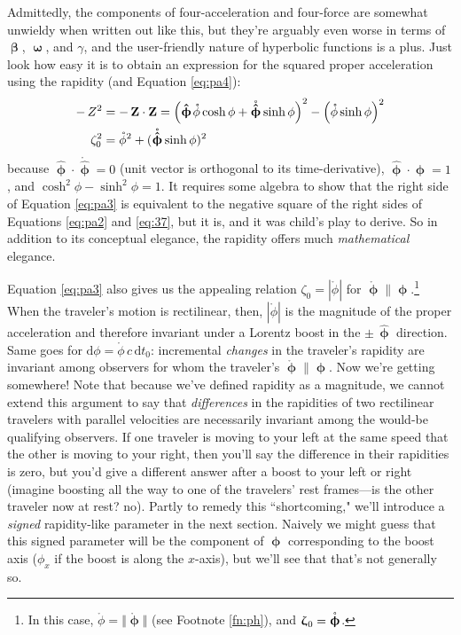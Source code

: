 \documentclass[12pt]{article}
\renewcommand{\vv}[1]{\mathbf{#1}}
\newcommand{\dd}[1]{\mathrm{d}#1}
\newcommand{\vvbeta}{\bm{\upbeta}}
\newcommand{\vvomega}{\bm{\upomega}}
\newcommand{\vvphi}{\bm{\upphi}}
\newcommand{\hatphi}{\bm{\hat{\upphi}}}
\newcommand{\vvzeta}{\bm{\upzeta}}
\begin{document}
Admittedly, the components of four-acceleration and four-force are somewhat unwieldy when written out like this, but they're arguably even worse in terms of $\vvbeta$, $\vvomega$, and $\gamma$, and the user-friendly nature of hyperbolic functions is a plus. Just look how easy it is to obtain an expression for the squared proper acceleration using the rapidity (and Equation \ref{eq:pa4}):
\begin{equation}\label{eq:pa3}
\begin{split}
- \, Z^2 &= - \, \vv Z \cdot \vv Z = \left( \hatphi \mkern1.5mu \mathring{\phi} \cosh{\phi} + \mathring{\hatphi} \sinh{\phi} \right)^2 - \left( \mathring{\phi} \sinh{\phi} \right)^2 \\
\zeta_0^2 &= \mathring{\phi}^2 + (\mathring{\hatphi} \sinh{\phi})^2 
\end{split}
\end{equation}
because $\hatphi \cdot \mathring{\hatphi} = 0$ (unit vector is orthogonal to its time-derivative), $\hatphi \cdot \hatphi = 1$, and $\cosh^{2}{\phi} - \sinh^{2}{\phi} = 1$. It requires some algebra to show that the right side of Equation \ref{eq:pa3} is equivalent to the negative square of the right sides of Equations \ref{eq:pa2} and \ref{eq:37}, but it is, and it was child's play to derive. So in addition to its conceptual elegance, the rapidity offers much \emph{mathematical} elegance.

Equation \ref{eq:pa3} also gives us the appealing relation $\zeta_0 = | \mathring{\phi} |$ for $\mathring{\vvphi} \parallel \vvphi$.\footnote{In this case, $\mathring{\phi} = \Vert \mathring{\vvphi} \Vert$ (see Footnote \ref{fn:ph}), and $\vvzeta_{\mkern1mu 0} = \mathring{\vvphi}$.} When the traveler's motion is rectilinear, then, $| \mathring{\phi} |$ is the magnitude of the proper acceleration and therefore invariant under a Lorentz boost in the $\pm \, \hatphi$ direction. Same goes for $\dd \phi = \mathring{\phi} \, c \, \dd t_0$: incremental \emph{changes} in the traveler's rapidity are invariant among observers for whom the traveler's $\mathring{\vvphi} \parallel \vvphi$. Now we're getting somewhere! Note that because we've defined rapidity as a magnitude, we cannot extend this argument to say that \emph{differences} in the rapidities of two rectilinear travelers with parallel velocities are necessarily invariant among the would-be qualifying observers. If one traveler is moving to your left at the same speed that the other is moving to your right, then you'll say the difference in their rapidities is zero, but you'd give a different answer after a boost to your left or right (imagine boosting all the way to one of the travelers' rest frames---is the other traveler now at rest? no). Partly to remedy this ``shortcoming," we'll introduce a \emph{signed} rapidity-like parameter in the next section. Naively we might guess that this signed parameter will be the component of $\vvphi$ corresponding to the boost axis ($\phi_x$ if the boost is along the $x$-axis), but we'll see that that's not generally so.
\end{document}
